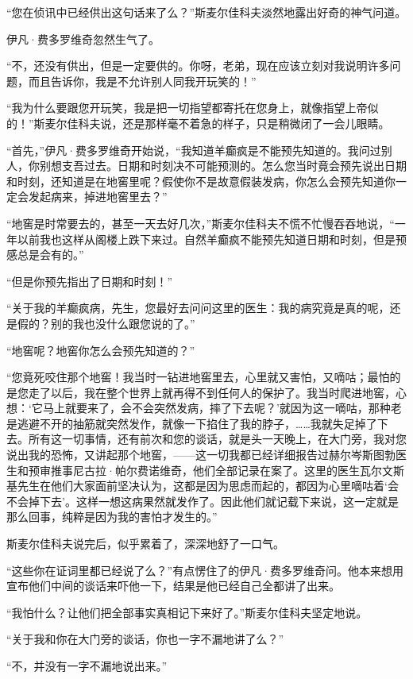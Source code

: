 \par “您在侦讯中已经供出这句话来了么？”斯麦尔佳科夫淡然地露出好奇的神气问道。
\par 伊凡·费多罗维奇忽然生气了。
\par “不，还没有供出，但是一定要供的。你呀，老弟，现在应该立刻对我说明许多问题，而且告诉你，我是不允许别人同我开玩笑的！”
\par “我为什么要跟您开玩笑，我是把一切指望都寄托在您身上，就像指望上帝似的！”斯麦尔佳科夫说，还是那样毫不着急的样子，只是稍微闭了一会儿眼睛。
\par “首先，”伊凡·费多罗维奇开始说，“我知道羊癫疯是不能预先知道的。我问过别人，你别想支吾过去。日期和时刻决不可能预测的。怎么您当时竟会预先说出日期和时刻，还知道是在地窖里呢？假使你不是故意假装发病，你怎么会预先知道你一定会发起病来，掉进地窖里去？”
\par “地窖是时常要去的，甚至一天去好几次，”斯麦尔佳科夫不慌不忙慢吞吞地说，“一年以前我也这样从阁楼上跌下来过。自然羊癫疯不能预先知道日期和时刻，但是预感总是会有的。”
\par “但是你预先指出了日期和时刻！”
\par “关于我的羊癫疯病，先生，您最好去问问这里的医生：我的病究竟是真的呢，还是假的？别的我也没什么跟您说的了。”
\par “地窖呢？地窖你怎么会预先知道的？”
\par “您竟死咬住那个地窖！我当时一钻进地窖里去，心里就又害怕，又嘀咕；最怕的是您走了以后，我在整个世界上就再得不到任何人的保护了。我当时爬进地窖，心想：‘它马上就要来了，会不会突然发病，摔了下去呢？’就因为这一嘀咕，那种老是逃避不开的抽筋就突然发作，就像一下掐住了我的脖子，……我就失足掉了下去。所有这一切事情，还有前次和您的谈话，就是头一天晚上，在大门旁，我对您说出我的恐怖，又讲起那个地窖，——这一切我都已经详细报告过赫尔岑斯图勃医生和预审推事尼古拉·帕尔费诺维奇，他们全部记录在案了。这里的医生瓦尔文斯基先生在他们大家面前坚决认为，这都是因为思虑而起的，都因为心里嘀咕着‘会不会掉下去’。这样一想这病果然就发作了。因此他们就记载下来说，这一定就是那么回事，纯粹是因为我的害怕才发生的。”
\par 斯麦尔佳科夫说完后，似乎累着了，深深地舒了一口气。
\par “这些你在证词里都已经说了么？”有点愣住了的伊凡·费多罗维奇问。他本来想用宣布他们中间的谈话来吓他一下，结果是他已经自己全都讲了出来。
\par “我怕什么？让他们把全部事实真相记下来好了。”斯麦尔佳科夫坚定地说。
\par “关于我和你在大门旁的谈话，你也一字不漏地讲了么？”
\par “不，并没有一字不漏地说出来。”
